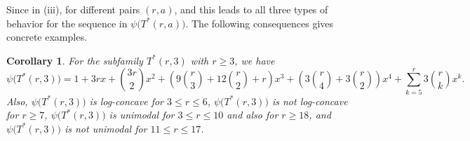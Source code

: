 \documentclass[12pt,twoside]{article}
\newtheorem{corollary}[theorem]{Corollary}
\begin{document}
		Since in (iii), for different pairs $(r,a)$, and this leads to all three types of behavior for the sequence in $\psi\bigl(T^*(r,a)\bigr)$. The following consequences gives concrete examples.
		
		\begin{corollary}\label{cor:Tstar-r3}
			For the subfamily $T^*(r,3)$ with $r\ge 3$, we have
			{\footnotesize$$
			\psi\bigl(T^*(r,3)\bigr)
			=
			1+3rx+\binom{3r}{2}x^2
			+\left(9\binom{r}{3}+12\binom{r}{2}+r\right)x^3
			+\left(3\binom{r}{4}+3\binom{r}{2}\right)x^4
			+\sum_{k=5}^{r}3\binom{r}{k}x^k.
			$$}
			Also,  $\psi\bigl(T^*(r,3)\bigr)$ is log-concave for $3\le r\le 6$,   $\psi\bigl(T^*(r,3)\bigr)$ is not log-concave for $r\ge 7$,   $\psi\bigl(T^*(r,3)\bigr)$ is unimodal for $3\le r\le 10$ and also for $r\ge 18$, and   $\psi\bigl(T^*(r,3)\bigr)$ is not unimodal for $11\le r\le 17$. 
		\end{corollary}
		
\end{document}
